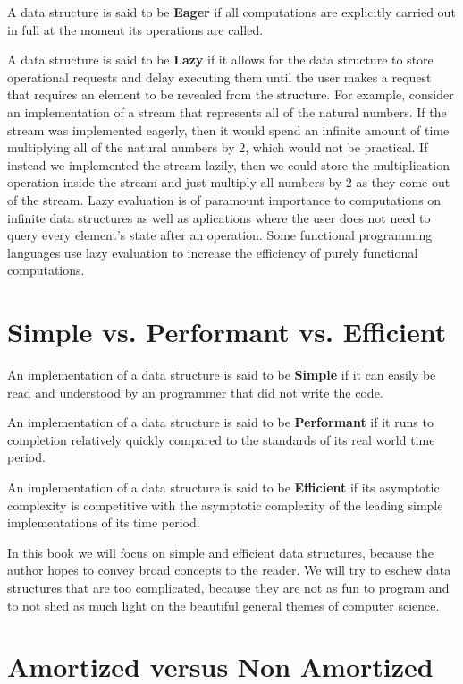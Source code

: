 \documentclass[12pt, letterpaper]{book}
\begin{document}
A data structure is said to be \textbf{Eager} if all computations are explicitly carried out in full at the moment its operations are called.

A data structure is said to be \textbf{Lazy} if it allows for the data structure to store operational requests and delay executing them until the user makes a request that requires an element to be revealed from the structure. For example, consider an implementation of a stream that represents all of the natural numbers. If the stream was implemented eagerly, then it would spend an infinite amount of time multiplying all of the natural numbers by 2, which would not be practical. If instead we implemented the stream lazily, then we could store the multiplication operation inside the stream and just multiply all numbers by 2 as they come out of the stream. Lazy evaluation is of paramount importance to computations on infinite data structures as well as aplications where the user does not need to query every element's state after an operation. Some functional programming languages use lazy evaluation to increase the efficiency of purely functional computations.

\section{Simple vs. Performant vs. Efficient}

An implementation of a data structure is said to be \textbf{Simple} if it can easily be read and understood by an programmer that did not write the code.

An implementation of a data structure is said to be \textbf{Performant} if it runs to completion relatively quickly compared to the standards of its real world time period.

An implementation of a data structure is said to be \textbf{Efficient} if its asymptotic complexity is competitive with the asymptotic complexity of the leading simple implementations of its time period.

In this book we will focus on simple and efficient data structures, because the author hopes to convey broad concepts to the reader. We will try to eschew data structures that are too complicated, because they are not as fun to program and to not shed as much light on the beautiful general themes of computer science.

\section{Amortized versus Non Amortized}
\end{document}
